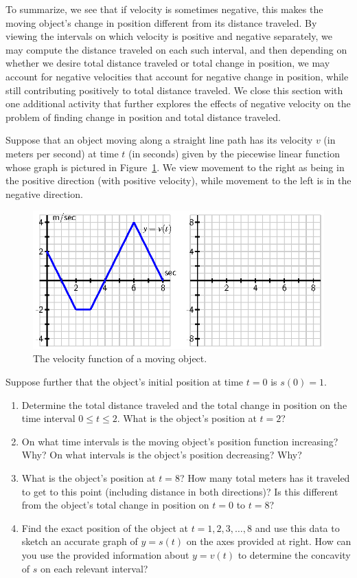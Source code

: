 To summarize, we see that if velocity is sometimes negative, this makes the moving object's change in position different from its distance traveled.  By viewing the intervals on which velocity is positive and negative separately, we may compute the distance traveled on each such interval, and then depending on whether we desire total distance traveled or total change in position, we may account for negative velocities that account for negative change in position, while still contributing positively to total distance traveled.  We close this section with one additional activity that further explores the effects of negative velocity on the problem of finding change in position and total distance traveled.

\begin{activity} \label{A:4.1.3}  Suppose that an object moving along a straight line path has its velocity $v$ (in meters per second) at time $t$ (in seconds) given by the piecewise linear function whose graph is pictured in Figure~\ref{F:4.1.Act3}.  We view movement to the right as being in the positive direction (with positive velocity), while movement to the left is in the negative direction.
\begin{figure}[h]
\begin{center}
\includegraphics{figures/4_1_Act3.eps}
\caption{The velocity function of a moving object.} \label{F:4.1.Act3}
\end{center}
\end{figure}
Suppose further that the object's initial position at time $t = 0$ is $s(0) = 1$.
\begin{enumerate}
	\item Determine the total distance traveled and the total change in position on the time interval $0 \le t \le 2$.  What is the object's position at $t = 2$?
	\item On what time intervals is the moving object's position function increasing?  Why?  On what intervals is the object's position decreasing?  Why?
	\item What is the object's position at $t = 8$?  How many total meters has it traveled to get to this point (including distance in both directions)?  Is this different from the object's total change in position on $t = 0$ to $t = 8$?
	\item Find the exact position of the object at $t = 1, 2, 3, \ldots, 8$ and use this data to sketch an accurate graph of $y = s(t)$ on the axes provided at right.  How can you use the provided information about $y = v(t)$ to determine the concavity of $s$ on each relevant interval?
\end{enumerate}
\end{activity}
